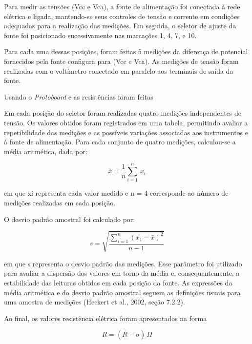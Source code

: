 \documentclass[a4paper,12pt]{article}
\begin{document}
\begin{enumerate}[label=\alph*.]
Para medir as tensões (Vcc e Vca), a fonte de alimentação foi conectada à rede elétrica e ligada, mantendo-se seus controles de tensão e corrente em condições adequadas para a realização das medições. 
Em seguida, o seletor de ajuste da fonte foi posicionado sucessivamente nas marcações 1, 4, 7, e 10.

Para cada uma dessas posições, foram feitas 5 medições da diferença de potencial fornecidos pela fonte configura para (Vcc e Vca). As medições de tensão foram realizadas com o voltímetro conectado em paralelo aos terminais de saída da fonte.

Usando o \textit{Protoboard} e as resistências foram feitas 

Em cada posição do seletor foram realizadas quatro medições independentes de
tensão. Os valores obtidos foram registrados em uma tabela, permitindo avaliar a repetibilidade das medições e as possíveis variações associadas aos instrumentos e à fonte de alimentação. Para cada conjunto de quatro medições, calculou-se a média aritmética, dada por:

\[
\bar{x} = \frac{1}{n}\sum_{i=1}^{n}\,x_i
\]

em que xi representa cada valor medido e n = 4 corresponde ao número de 
medições realizadas em cada posição.

O desvio padrão amostral foi calculado por:

\[
  s = \sqrt{\frac{\sum_{i=1}^{n}(x_1-\bar{x})^2}{n-1}}
\]

em que s representa o desvio padrão das medições. Esse parâmetro foi utilizado
para avaliar a dispersão dos valores em torno da média e, consequentemente, a
estabilidade das leituras obtidas em cada posição da fonte. As expressões da média
aritmética e do desvio padrão amostral seguem as definições usuais para uma amostra
de medições (Heckert et al., 2002, seção 7.2.2).

Ao final, os valores resistência elétrica foram apresentados na forma

\[
    R = (\bar{R} - \sigma)\, \Omega
\]


\end{enumerate}
\end{document}

